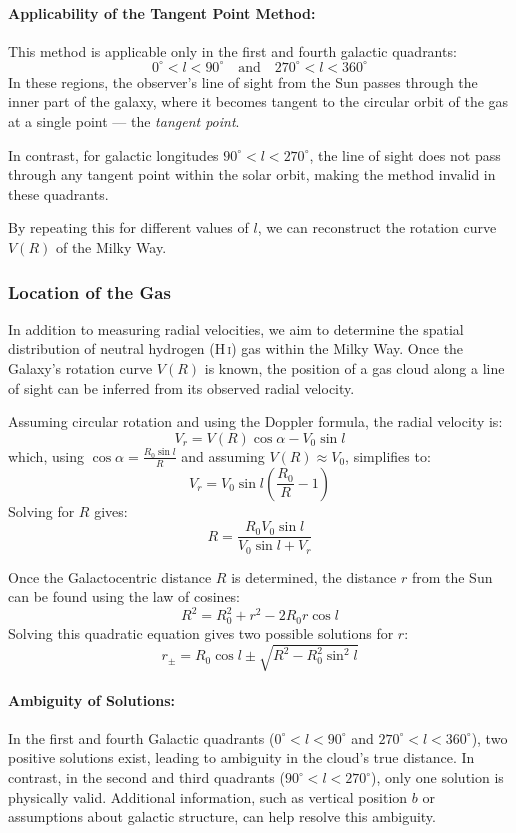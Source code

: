 \documentclass[12pt,a4paper]{article}
\begin{document}
\paragraph{Applicability of the Tangent Point Method:}
This method is applicable only in the first and fourth galactic quadrants:
\[
0^\circ < l < 90^\circ \quad \text{and} \quad 270^\circ < l < 360^\circ
\]
In these regions, the observer’s line of sight from the Sun passes through the inner part of the galaxy, where it becomes tangent to the circular orbit of the gas at a single point — the \emph{tangent point}.

In contrast, for galactic longitudes \(90^\circ < l < 270^\circ\), the line of sight does not pass through any tangent point within the solar orbit, making the method invalid in these quadrants.

By repeating this for different values of $l$, we can reconstruct the rotation curve $V(R)$ of the Milky Way.

\subsubsection*{Location of the Gas}

In addition to measuring radial velocities, we aim to determine the spatial distribution of neutral hydrogen (H\,\textsc{i}) gas within the Milky Way. Once the Galaxy’s rotation curve $V(R)$ is known, the position of a gas cloud along a line of sight can be inferred from its observed radial velocity.

Assuming circular rotation and using the Doppler formula, the radial velocity is:
\[
V_r = V(R) \cos \alpha - V_0 \sin l
\]
which, using $\cos \alpha = \frac{R_0 \sin l}{R}$ and assuming $V(R) \approx V_0$, simplifies to:
\[
V_r = V_0 \sin l \left( \frac{R_0}{R} - 1 \right)
\]
Solving for $R$ gives:
\[
R = \frac{R_0 V_0 \sin l}{V_0 \sin l + V_r}
\]

Once the Galactocentric distance $R$ is determined, the distance $r$ from the Sun can be found using the law of cosines:
\[
R^2 = R_0^2 + r^2 - 2R_0 r \cos l
\]
Solving this quadratic equation gives two possible solutions for $r$:
\[
r_{\pm} = R_0 \cos l \pm \sqrt{R^2 - R_0^2 \sin^2 l}
\]

\paragraph{Ambiguity of Solutions:}
In the first and fourth Galactic quadrants ($0^\circ < l < 90^\circ$ and $270^\circ < l < 360^\circ$), two positive solutions exist, leading to ambiguity in the cloud's true distance. In contrast, in the second and third quadrants ($90^\circ < l < 270^\circ$), only one solution is physically valid. Additional information, such as vertical position $b$ or assumptions about galactic structure, can help resolve this ambiguity.
\end{document}
